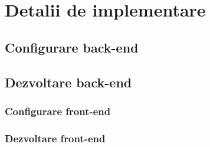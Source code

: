\chapter{Detalii de implementare}
\label{chapter:implementare}

\section{Configurare back-end}
\label{sec:implementare-backend}

\section{Dezvoltare back-end}
\label{sec:implementare-backend}

\subsection{Configurare front-end}
\label{subsec:implementare-frontend}

\subsection{Dezvoltare front-end}
\label{subsec:implementare-frontend}